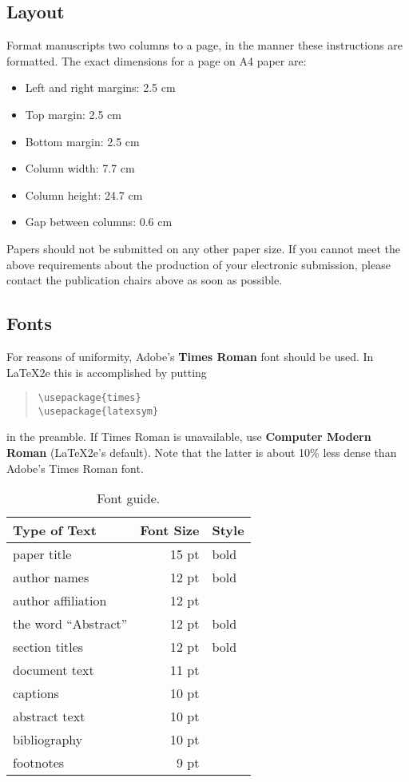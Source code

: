 \subsection{Layout}
\label{ssec:layout}

Format manuscripts two columns to a page, in the manner these
instructions are formatted. The exact dimensions for a page on A4
paper are:

\begin{itemize}
\item Left and right margins: 2.5 cm
\item Top margin: 2.5 cm
\item Bottom margin: 2.5 cm
\item Column width: 7.7 cm
\item Column height: 24.7 cm
\item Gap between columns: 0.6 cm
\end{itemize}

\noindent Papers should not be submitted on any other paper size.
 If you cannot meet the above requirements about the production of 
 your electronic submission, please contact the publication chairs 
 above as soon as possible.

\subsection{Fonts}

For reasons of uniformity, Adobe's {\bf Times Roman} font should be
used. In \LaTeX2e{} this is accomplished by putting

\begin{quote}
\begin{verbatim}
\usepackage{times}
\usepackage{latexsym}
\end{verbatim}
\end{quote}
in the preamble. If Times Roman is unavailable, use {\bf Computer
  Modern Roman} (\LaTeX2e{}'s default).  Note that the latter is about
  10\% less dense than Adobe's Times Roman font.

\begin{table}[t!]
\begin{center}
\begin{tabular}{|l|rl|}
\hline \bf Type of Text & \bf Font Size & \bf Style \\ \hline
paper title & 15 pt & bold \\
author names & 12 pt & bold \\
author affiliation & 12 pt & \\
the word ``Abstract'' & 12 pt & bold \\
section titles & 12 pt & bold \\
document text & 11 pt  &\\
captions & 10 pt & \\
abstract text & 10 pt & \\
bibliography & 10 pt & \\
footnotes & 9 pt & \\
\hline
\end{tabular}
\end{center}
\caption{\label{font-table} Font guide. }
\end{table}


